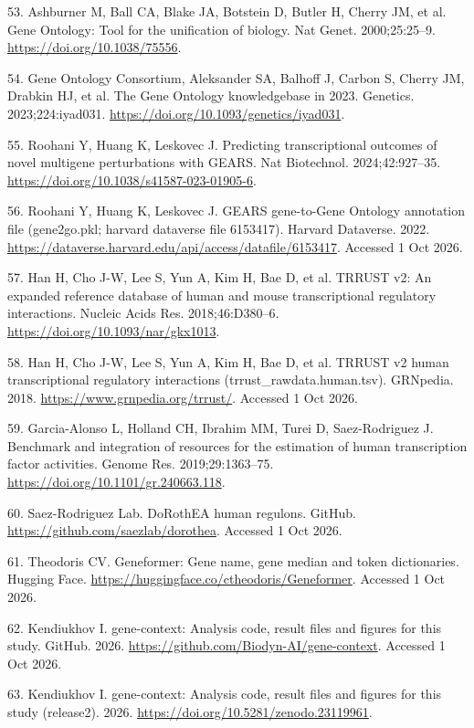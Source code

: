 \documentclass[
  11pt,
]{article}
\newlength{\cslhangindent}
\newenvironment{CSLReferences}[2] %
 {\begin{list}{}{%
  \setlength{\itemindent}{0pt}
  \setlength{\leftmargin}{0pt}
  \setlength{\parsep}{0pt}
  \ifodd #1
   \setlength{\leftmargin}{\cslhangindent}
   \setlength{\itemindent}{-1\cslhangindent}
  \fi
  \setlength{\itemsep}{#2\baselineskip}}}
 {\end{list}}
\begin{document}
\begin{CSLReferences}{0}{1}
53. {Ashburner M, Ball CA, Blake JA, Botstein D, Butler H, Cherry JM, et
al.} Gene {Ontology}: Tool for the unification of biology. Nat Genet.
2000;25:25--9. \url{https://doi.org/10.1038/75556}.

54. {Gene Ontology Consortium, Aleksander SA, Balhoff J, Carbon S,
Cherry JM, Drabkin HJ, et al.} The {Gene Ontology} knowledgebase in
2023. Genetics. 2023;224:iyad031.
\url{https://doi.org/10.1093/genetics/iyad031}.

55. Roohani Y, Huang K, Leskovec J. Predicting transcriptional outcomes
of novel multigene perturbations with {GEARS}. Nat Biotechnol.
2024;42:927--35. \url{https://doi.org/10.1038/s41587-023-01905-6}.

56. Roohani Y, Huang K, Leskovec J. {GEARS} gene-to-{Gene Ontology}
annotation file (gene2go.pkl; harvard dataverse file 6153417). Harvard
Dataverse. 2022.
\url{https://dataverse.harvard.edu/api/access/datafile/6153417}.
Accessed 1 Oct 2026.

57. {Han H, Cho J-W, Lee S, Yun A, Kim H, Bae D, et al.} {TRRUST} v2: An
expanded reference database of human and mouse transcriptional
regulatory interactions. Nucleic Acids Res. 2018;46:D380--6.
\url{https://doi.org/10.1093/nar/gkx1013}.

58. {Han H, Cho J-W, Lee S, Yun A, Kim H, Bae D, et al.} {TRRUST} v2
human transcriptional regulatory interactions
(trrust\_rawdata.human.tsv). GRNpedia. 2018.
\url{https://www.grnpedia.org/trrust/}. Accessed 1 Oct 2026.

59. Garcia-Alonso L, Holland CH, Ibrahim MM, Turei D, Saez-Rodriguez J.
Benchmark and integration of resources for the estimation of human
transcription factor activities. Genome Res. 2019;29:1363--75.
\url{https://doi.org/10.1101/gr.240663.118}.

60. Saez-Rodriguez Lab. {DoRothEA} human regulons. GitHub.
\url{https://github.com/saezlab/dorothea}. Accessed 1 Oct 2026.

61. Theodoris CV. Geneformer: Gene name, gene median and token
dictionaries. Hugging Face.
\url{https://huggingface.co/ctheodoris/Geneformer}. Accessed 1 Oct 2026.

62. Kendiukhov I. {gene-context}: Analysis code, result files and
figures for this study. GitHub. 2026.
\url{https://github.com/Biodyn-AI/gene-context}. Accessed 1 Oct 2026.

63. Kendiukhov I. {gene-context}: Analysis code, result files and
figures for this study (release2). 2026.
\url{https://doi.org/10.5281/zenodo.23119961}.

\end{CSLReferences}
\end{document}
